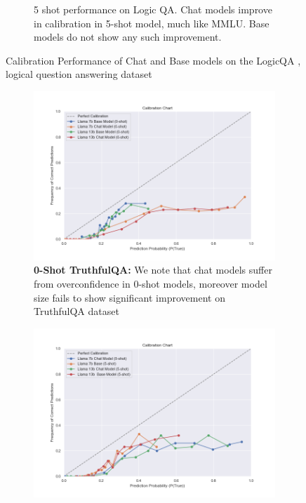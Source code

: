 \documentclass[11pt]{article}
\begin{document}
\begin{figure}
\begin{subfigure}[b]{0.49\textwidth}
         \caption{5 shot performance on Logic QA. Chat models improve in calibration in 5-shot model, much like MMLU. Base models do not show any such improvement.}
         \label{fig:5-shot-logicqa}
     \end{subfigure}     
        \caption{Calibration Performance of Chat and Base models on the LogicQA , logical question answering dataset}
        \label{fig:three graphs}
\end{figure}

\begin{figure}
     \centering
     \begin{subfigure}[b]{0.49\textwidth}
         \centering \includegraphics[width=1.3\textwidth]{figures/0-shot-truthful_qa.png}
         \caption{\textbf{0-Shot TruthfulQA:} We note that chat models suffer from overconfidence in 0-shot models, moreover model size fails to show significant improvement on TruthfulQA dataset}
         \label{fig:0-shot-MMLU}
     \end{subfigure}
     \hfill
     \begin{subfigure}[b]{0.49\textwidth}
         \centering
         \includegraphics[width=1.3\textwidth]{figures/5-shot-TruthQA.png}

\end{subfigure}
\end{figure}
\end{document}
